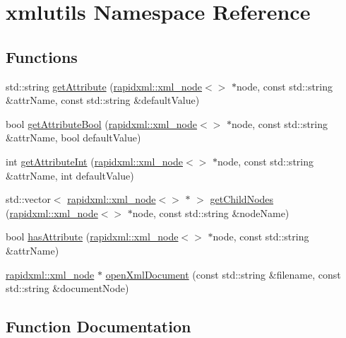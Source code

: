 \hypertarget{namespacexmlutils}{}\section{xmlutils Namespace Reference}
\label{namespacexmlutils}
\subsection*{Functions}
\begin{DoxyCompactItemize}
\item 
std\+::string \mbox{\hyperlink{namespacexmlutils_a68377575c0ba371e1221fceac39faf5f}{get\+Attribute}} (\mbox{\hyperlink{classrapidxml_1_1xml__node}{rapidxml\+::xml\+\_\+node}}$<$$>$ $\ast$node, const std\+::string \&attr\+Name, const std\+::string \&default\+Value)
\item 
bool \mbox{\hyperlink{namespacexmlutils_add5287d01ce8f47fbad34af589a3b52c}{get\+Attribute\+Bool}} (\mbox{\hyperlink{classrapidxml_1_1xml__node}{rapidxml\+::xml\+\_\+node}}$<$$>$ $\ast$node, const std\+::string \&attr\+Name, bool default\+Value)
\item 
int \mbox{\hyperlink{namespacexmlutils_aad19c1ecd2c1a058f7710f6d2246de87}{get\+Attribute\+Int}} (\mbox{\hyperlink{classrapidxml_1_1xml__node}{rapidxml\+::xml\+\_\+node}}$<$$>$ $\ast$node, const std\+::string \&attr\+Name, int default\+Value)
\item 
std\+::vector$<$ \mbox{\hyperlink{classrapidxml_1_1xml__node}{rapidxml\+::xml\+\_\+node}}$<$$>$ $\ast$ $>$ \mbox{\hyperlink{namespacexmlutils_aae534755778e439dfab1aa1856e27002}{get\+Child\+Nodes}} (\mbox{\hyperlink{classrapidxml_1_1xml__node}{rapidxml\+::xml\+\_\+node}}$<$$>$ $\ast$node, const std\+::string \&node\+Name)
\item 
bool \mbox{\hyperlink{namespacexmlutils_ae8f64d4332fabd1d2a4b2f623522003b}{has\+Attribute}} (\mbox{\hyperlink{classrapidxml_1_1xml__node}{rapidxml\+::xml\+\_\+node}}$<$$>$ $\ast$node, const std\+::string \&attr\+Name)
\item 
\mbox{\hyperlink{classrapidxml_1_1xml__node}{rapidxml\+::xml\+\_\+node}} $\ast$ \mbox{\hyperlink{namespacexmlutils_a8b4e27a7832af00345b3c4909a09f5b7}{open\+Xml\+Document}} (const std\+::string \&filename, const std\+::string \&document\+Node)
\end{DoxyCompactItemize}


\subsection{Function Documentation}
\mbox{\label{namespacexmlutils_a68377575c0ba371e1221fceac39faf5f}} 
